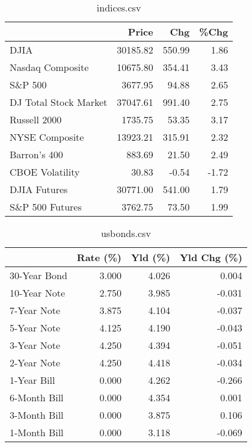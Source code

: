 \documentclass{article}%
\begin{document}
%


\begin{table}[htbp]%
\caption{indices.csv}%
\centering%
\begin{adjustbox}{width=1\textwidth}%
\begin{tabular}{lrrr}
\toprule
                      &    Price &    Chg &  \%Chg \\
\midrule
                 DJIA & 30185.82 & 550.99 &  1.86 \\
     Nasdaq Composite & 10675.80 & 354.41 &  3.43 \\
              S\&P 500 &  3677.95 &  94.88 &  2.65 \\
DJ Total Stock Market & 37047.61 & 991.40 &  2.75 \\
         Russell 2000 &  1735.75 &  53.35 &  3.17 \\
       NYSE Composite & 13923.21 & 315.91 &  2.32 \\
         Barron's 400 &   883.69 &  21.50 &  2.49 \\
      CBOE Volatility &    30.83 &  -0.54 & -1.72 \\
         DJIA Futures & 30771.00 & 541.00 &  1.79 \\
      S\&P 500 Futures &  3762.75 &  73.50 &  1.99 \\
\bottomrule
\end{tabular}
%
\end{adjustbox}%
\end{table}

%


\begin{table}[htbp]%
\caption{usbonds.csv}%
\centering%
\begin{adjustbox}{width=1\textwidth}%
\begin{tabular}{lrrr}
\toprule
             &  Rate (\%) &  Yld (\%) &  Yld Chg (\%) \\
\midrule
30-Year Bond &     3.000 &    4.026 &        0.004 \\
10-Year Note &     2.750 &    3.985 &       -0.031 \\
 7-Year Note &     3.875 &    4.104 &       -0.037 \\
 5-Year Note &     4.125 &    4.190 &       -0.043 \\
 3-Year Note &     4.250 &    4.394 &       -0.051 \\
 2-Year Note &     4.250 &    4.418 &       -0.034 \\
 1-Year Bill &     0.000 &    4.262 &       -0.266 \\
6-Month Bill &     0.000 &    4.354 &        0.001 \\
3-Month Bill &     0.000 &    3.875 &        0.106 \\
1-Month Bill &     0.000 &    3.118 &       -0.069 \\
\bottomrule
\end{tabular}
%
\end{adjustbox}%
\end{table}
\end{document}
